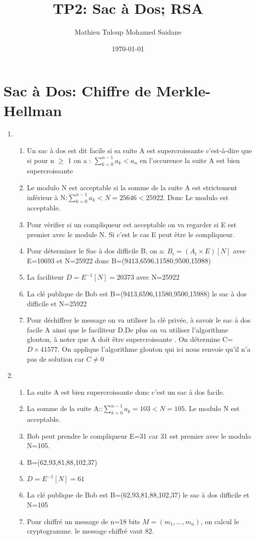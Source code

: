 \documentclass[titlepage]{article}
\title{TP2: Sac à Dos; RSA}
\author{Mathieu Tuloup Mohamed Saidane}
\date{\today}
\begin{document}
\maketitle

\section{Sac à Dos: Chiffre de Merkle-Hellman}
\begin{enumerate}
    \item \begin{enumerate}
    \item Un sac à dos est dit facile si sa suite A est supercroissante c'est-à-dire que si pour n $\geq$ 1 on a : 
        $\sum_{k=0}^{n-1} a_k<a_n   $ en l'occurence la suite A est bien supercroissante
    
    \item Le modulo N est acceptable si la somme de la suite A est strictement inférieur à N:$\sum_{k=0}^{n-1} a_k < N=25646<25922$. Donc Le modulo est acceptable.
    \item Pour vérifier si un compliqueur est acceptable on va regarder si E est premier avec le module N. Si c'est le cas E peut être le compliqueur.
    \item Pour déterminer le Sac à dos difficile B, on a: $B_i=(A_i \times E)[N] $ avec E=10693 et N=25922 donc B=(9413,6596,11580,9500,15988)
    \item La faciliteur $D=E^{-1}[N]=20373 $ avec N=25922  
    \item La clé publique de Bob est B=(9413,6596,11580,9500,15988) le sac à dos difficile et N=25922
    \item Pour déchiffrer le message on va utiliser la clé privée, à savoir le sac à dos facile A ainsi que le faciliteur D.De plus on va utiliser l'algorithme glouton, à noter que A doit être supercroissante . On détermine C=$D\times 41577$. On applique l'algorithme glouton qui ici nous renvoie qu'il n'a pas de solution car $C\ne 0$
\end{enumerate}
 \item \begin{enumerate}
\item La suite A est bien supercroissante donc c'est un sac à dos facile.
 \item La somme de la suite A::$\sum_{k=0}^{n-1} a_k=103<N=105$. Le modulo N est acceptable.
 \item Bob peut prendre le compliqueur E=31 car 31 est premier avec le modulo N=105.
 \item B=(62,93,81,88,102,37)
\item $D=E^{-1}[N]=61$
\item La clé publique de Bob est B=(62,93,81,88,102,37) le sac à dos difficile et N=105
\item Pour chiffré un message de n=18 bits $M=(m_1,...,m_n)$, on calcul le cryptogramme. le message chiffré vaut 82.
 \end{enumerate} 

    
    
\end{enumerate}
\end{document}
